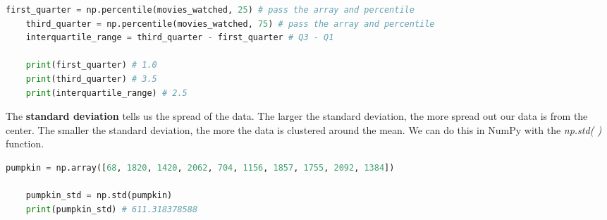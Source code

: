 \documentclass[11pt, a4paper]{article}
\begin{document}
\begin{spacing}{1.1}
\begin{lstlisting}[language=Python]
	first_quarter = np.percentile(movies_watched, 25) # pass the array and percentile
	third_quarter = np.percentile(movies_watched, 75) # pass the array and percentile
	interquartile_range = third_quarter - first_quarter # Q3 - Q1
	
	print(first_quarter) # 1.0
	print(third_quarter) # 3.5
	print(interquartile_range) # 2.5 \end{lstlisting}\vspace*{1mm}
	The \textbf{standard deviation} tells us the spread of the data. The larger the standard deviation, the more spread out our data is from the center. The smaller the standard deviation, the more the data is clustered around the mean. We can do this in NumPy with the \textit{np.std( )} function.
	\begin{lstlisting}[language=Python]
	pumpkin = np.array([68, 1820, 1420, 2062, 704, 1156, 1857, 1755, 2092, 1384])
	
	pumpkin_std = np.std(pumpkin)
	print(pumpkin_std) # 611.318378588 \end{lstlisting}\vspace*{4mm}
	

\end{spacing}
\end{document}
